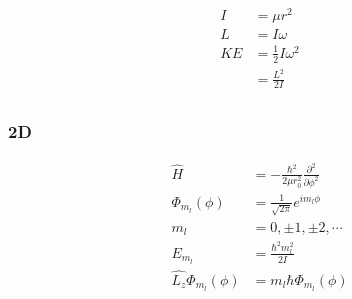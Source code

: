 \begin{align*}
I&=\mu r^2\\
L&=I\omega\\
KE&=\frac{1}{2}I\omega^2\\
&=\frac{L^2}{2I}\\
\end{align*}

\subsubsection{2D}
\begin{align*}
\hat{H}&=-\frac{\hbar^2}{2\mu r_0^2}\frac{\partial^2}{\partial \phi^2}\\
\Phi_{m_l}\left(\phi\right)&=\frac{1}{\sqrt{2\pi}}e^{im_l\phi}\\
m_l&=0, \pm1, \pm2, \cdots\\
E_{m_l}&=\frac{\hbar^2 m_l^2}{2I}\\
\hat{L_z}\Phi_{m_l}\left(\phi\right)&=m_l\hbar \Phi_{m_l}\left(\phi\right)
\end{align*}

